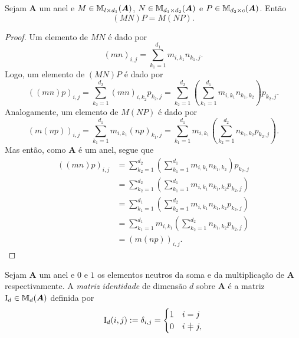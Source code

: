\begin{proposition}
	Sejam $\bm A$ um anel e $M \in \mathbb{M}_{l \times d_1}(\bm A)$, $N \in \mathbb{M}_{d_1 \times d_2}(\bm A)$ e $P \in \mathbb{M}_{d_2 \times c}(\bm A)$. Então
	\begin{equation*}
	(MN)P = M(NP).
	\end{equation*}
\end{proposition}
\begin{proof} Um elemento de $MN$ é dado por
	\begin{equation*}
	(mn)_{i,j} = \sum_{k_1=1}^{d_1} m_{i,k_1}n_{k_1,j}.
	\end{equation*}
Logo, um elemento de $(MN)P$ é dado por
	\begin{equation*}
	((mn)p)_{i,j} = \sum_{k_2=1}^{d_2} (mn)_{i,k_2}p_{k_2,j} = \sum_{k_2=1}^{d_2} \left(\sum_{k_1=1}^{d_1} m_{i,k_1}n_{k_1,k_2}\right)p_{k_2,j}.
	\end{equation*}
Analogamente, um elemento de $M(NP)$ é dado por
	\begin{equation*}
	(m(np))_{i,j} = \sum_{k_1=1}^{d_1} m_{i,k_1}(np)_{k_1,j} = \sum_{k_1=1}^{d_1} m_{i,k_1}\left(\sum_{k_2=1}^{d_2} n_{k_1,k_2}p_{k_2,j}\right).
	\end{equation*}
Mas então, como $\bm A$ é um anel, segue que
	\begin{align*}
	((mn)p)_{i,j}
	&= \sum_{k_2=1}^{d_2} \left(\sum_{k_1=1}^{d_1} m_{i,k_1}n_{k_1,k_2}\right)p_{k_2,j} \\
	&= \sum_{k_2=1}^{d_2} \left(\sum_{k_1=1}^{d_1} m_{i,k_1}n_{k_1,k_2}p_{k_2,j}\right) \\
	&= \sum_{k_1=1}^{d_1} \left(\sum_{k_2=1}^{d_2} m_{i,k_1}n_{k_1,k_2}p_{k_2,j}\right) \\
	&= \sum_{k_1=1}^{d_1} m_{i,k_1}\left(\sum_{k_2=1}^{d_2} n_{k_1,k_2}p_{k_2,j}\right) \\
	&= (m(np))_{i,j}.
	\end{align*}
\end{proof}

\begin{definition}
	Sejam $\bm A$ um anel e $0$ e $1$ os elementos neutros da soma e da multiplicação de $\bm A$ respectivamente. A \emph{matriz identidade} de dimensão $d$ sobre $\bm A$ é a matriz $\mathrm{I}_d \in \mathbb{M}_d(\bm A)$ definida por
	\begin{equation*}
	\Id_d(i,j) := \delta_{i,j} =
		\begin{cases}
			1 & i = j \\
			0 & i \neq j,
		\end{cases}
	\end{equation*}
\end{definition}

